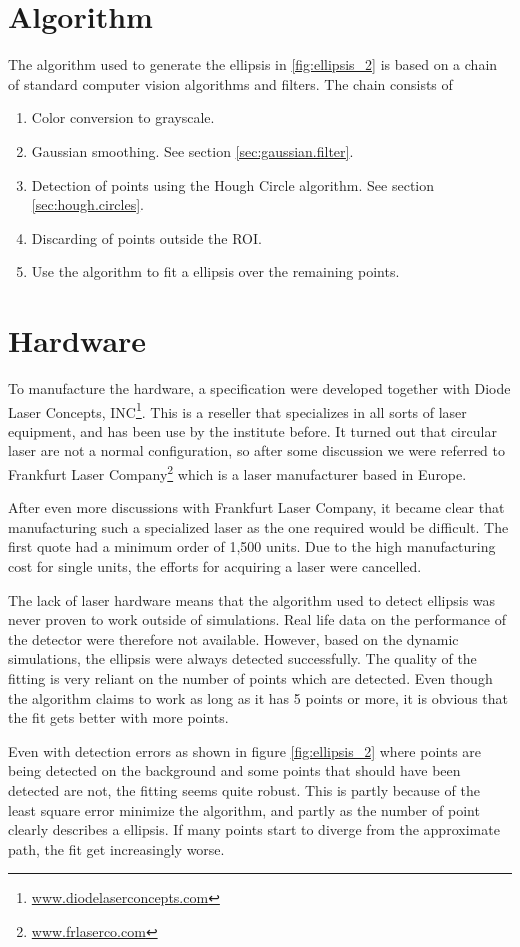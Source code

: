 \section{Algorithm}
The algorithm used to generate the ellipsis in \vref{fig:ellipsis_2} is based on a chain of standard 
computer vision algorithms and filters. The chain consists of

\begin{enumerate}
	\item Color conversion to grayscale.
	\item Gaussian smoothing. See section \vref{sec:gaussian.filter}.
	\item Detection of points using the Hough Circle algorithm. See section \vref{sec:hough.circles}.
	\item Discarding of points outside the ROI.
	\item Use the \citet{fitzgibbon95} algorithm to fit a ellipsis over the remaining points.
\end{enumerate}

\section{Hardware}
To manufacture the hardware, a specification were developed together with Diode Laser Concepts, INC\footnote{\url{www.diodelaserconcepts.com}}. This is a reseller that 
specializes in all sorts of laser equipment, and has been use by the institute before. It turned out that circular laser 
are not a normal configuration, so after some discussion we were referred to Frankfurt Laser Company\footnote{\url{www.frlaserco.com}} which 
is a laser manufacturer based in Europe.

After even more discussions with Frankfurt Laser Company, it became clear that manufacturing such a specialized laser as the one 
required would be difficult. The first quote had a minimum order of 1,500 units. Due to the high manufacturing cost for single 
units, the efforts for acquiring a laser were cancelled.

The lack of laser hardware means that the algorithm used to detect ellipsis was never proven to work outside of simulations. Real life 
data on the performance of the detector were therefore not available. However, based on the dynamic simulations, the ellipsis were always 
detected successfully. The quality of the fitting is very reliant on the number of points which are detected. Even though the 
algorithm claims to work as long as it has 5 points or more, it is obvious that the fit gets better with more points.

Even with detection errors as shown in figure \vref{fig:ellipsis_2} where points are being detected on the background and some points that should 
have been detected are not, the fitting seems quite robust. This is partly because of the least square error minimize the \citet{fitzgibbon95} algorithm, 
and partly as the number of point clearly describes a ellipsis. If many points start to diverge from the approximate path, the fit get increasingly worse.

